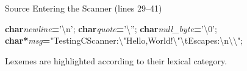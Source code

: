 \documentclass[aspectratio=169]{beamer}
\newcommand{\KW}[1]{\textcolor{keywordcolor}{\textbf{#1}}}
\newcommand{\ID}[1]{\textcolor{identifiercolor}{\textit{#1}}}
\newcommand{\STR}[1]{\colorbox{stringcolor!12}{\textcolor{stringcolor}{#1}}}
\newcommand{\CHAR}[1]{\colorbox{charcolor!12}{\textcolor{charcolor}{#1}}}
\newcommand{\OP}[1]{\textcolor{operatorcolor}{\textbf{#1}}}
\newcommand{\DELIM}[1]{\textcolor{delimitercolor}{#1}}
\begin{document}
\begin{frame}[fragile]{Source Entering the Scanner (lines 29--41)}
\begin{block}{}
\hspace*{0.18em}\hspace*{0.18em}\hspace*{0.18em}\hspace*{0.18em}
\hspace*{0.18em}\hspace*{0.18em}\hspace*{0.18em}\hspace*{0.18em}\KW{char}\hspace*{0.18em}\ID{newline}\hspace*{0.18em}\OP{=}\hspace*{0.18em}\CHAR{'\textbackslash{}n'}\DELIM{;}
\hspace*{0.18em}\hspace*{0.18em}\hspace*{0.18em}\hspace*{0.18em}\KW{char}\hspace*{0.18em}\ID{quote}\hspace*{0.18em}\OP{=}\hspace*{0.18em}\CHAR{'\textbackslash{}''}\DELIM{;}
\hspace*{0.18em}\hspace*{0.18em}\hspace*{0.18em}\hspace*{0.18em}\KW{char}\hspace*{0.18em}\ID{null\_byte}\hspace*{0.18em}\OP{=}\hspace*{0.18em}\CHAR{'\textbackslash{}0'}\DELIM{;}
\hspace*{0.18em}\hspace*{0.18em}\hspace*{0.18em}\hspace*{0.18em}\KW{char}\hspace*{0.18em}\OP{*}\ID{msg}\hspace*{0.18em}\OP{=}\hspace*{0.18em}\STR{"Testing\hspace*{0.18em}C\hspace*{0.18em}Scanner:\hspace*{0.18em}\textbackslash{}"Hello,\hspace*{0.18em}World!\textbackslash{}"\textbackslash{}tEscapes:\hspace*{0.18em}\textbackslash{}n\hspace*{0.18em}\textbackslash{}\textbackslash{}"}\DELIM{;}

\hspace*{0.18em}\hspace*{0.18em}\hspace*{0.18em}\hspace*{0.18em}
\end{block}
\vspace{0.1cm}
{\tiny Lexemes are highlighted according to their lexical category.}
\end{frame}
\end{document}
